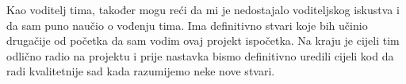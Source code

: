 	Kao voditelj tima, također mogu reći da mi je nedostajalo voditeljskog iskustva i da sam puno naučio o vođenju tima. Ima definitivno stvari koje bih učinio drugačije od početka da sam vodim ovaj projekt ispočetka. Na kraju je cijeli tim odlično radio na projektu i prije nastavka bismo definitivno uredili cijeli kod da radi kvalitetnije sad kada razumijemo neke nove stvari. \par

		
		\eject 